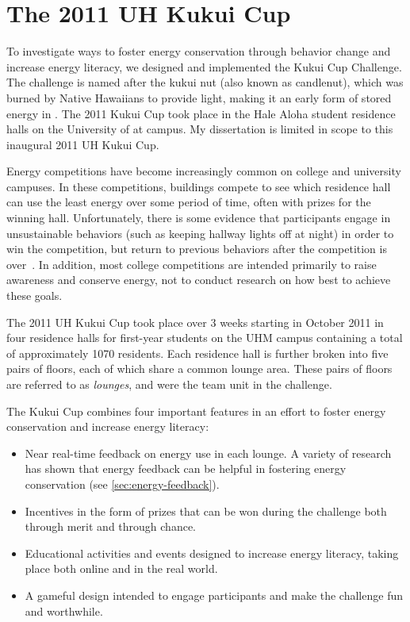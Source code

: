 \section{The 2011 UH Kukui Cup}
\label{sec:2011-kc-intro}

To investigate ways to foster energy conservation through behavior change and increase energy literacy, we designed and implemented the Kukui Cup Challenge. The challenge is named after the kukui nut (also known as candlenut), which was burned by Native Hawaiians to provide light, making it an early form of stored energy in \Hawaii. The 2011 Kukui Cup took place in the Hale Aloha student residence halls on the University of \Hawaii at \Manoa campus. My dissertation is limited in scope to this inaugural 2011 UH Kukui Cup.

Energy competitions have become increasingly common on college and university campuses. In these competitions, buildings compete to see which residence hall can use the least energy over some period of time, often with prizes for the winning hall. Unfortunately, there is some evidence that participants engage in unsustainable behaviors (such as keeping hallway lights off at night) in order to win the competition, but return to previous behaviors after the competition is over~\cite{petersen-dorm-energy-reduction}. In addition, most college competitions are intended primarily to raise awareness and conserve energy, not to conduct research on how best to achieve these goals.

The 2011 UH Kukui Cup took place over 3 weeks starting in October 2011 in four residence halls for first-year students on the UHM campus containing a total of approximately 1070 residents. Each residence hall is further broken into five pairs of floors, each of which share a common lounge area. These pairs of floors are referred to as \emph{lounges}, and were the team unit in the challenge.

The Kukui Cup combines four important features in an effort to foster energy conservation and increase energy literacy:

\begin{itemize}
	\item Near real-time feedback on energy use in each lounge. A variety of research has shown that energy feedback can be helpful in fostering energy conservation (see \autoref{sec:energy-feedback}).
	\item Incentives in the form of prizes that can be won during the challenge both through merit and through chance.
	\item Educational activities and events designed to increase energy literacy, taking place both online and in the real world.
	\item A gameful design intended to engage participants and make the challenge fun and worthwhile.
\end{itemize}

